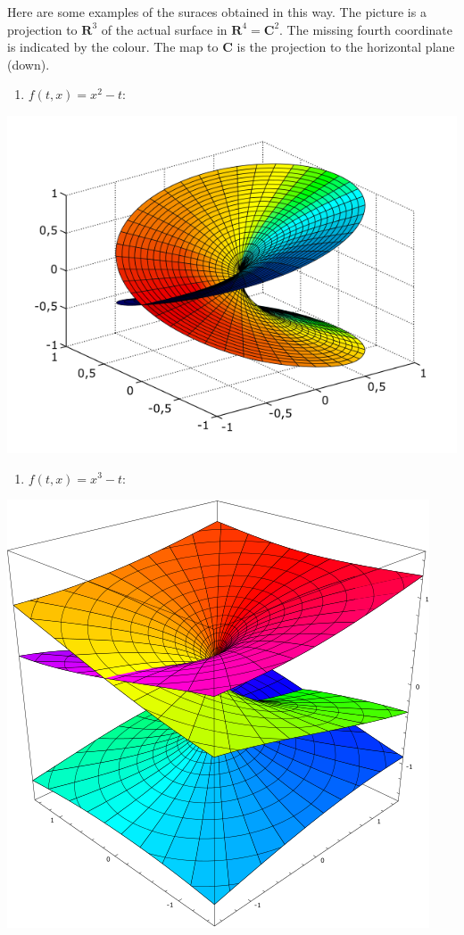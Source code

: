 \documentclass[11pt]{article}
\begin{document}
Here are some examples of the suraces obtained in this way.
The picture is a projection to \(\mathbf{R}^3\) of the actual surface in \(\mathbf{R}^4 = \mathbf{C}^2\).
The missing fourth coordinate is indicated by the colour.
The map to \(\mathbf{C}\) is the projection to the horizontal plane (down).

\begin{enumerate}
\item \(f(t,x) = x^2 - t\):
\end{enumerate}
\begin{center}
\includegraphics[width=.9\linewidth]{assets/Course_notes/2023-03-24_14-32-34_620px-Riemann_sqrt.svg.png}
\end{center}


\begin{enumerate}
\item \(f(t,x) = x^3 - t\):
\end{enumerate}

\begin{center}
\includegraphics[width=.9\linewidth]{assets/Course_notes/2023-03-24_14-34-56_473px-Riemann_surface_cube_root.svg.png}
\end{center}
\end{document}

